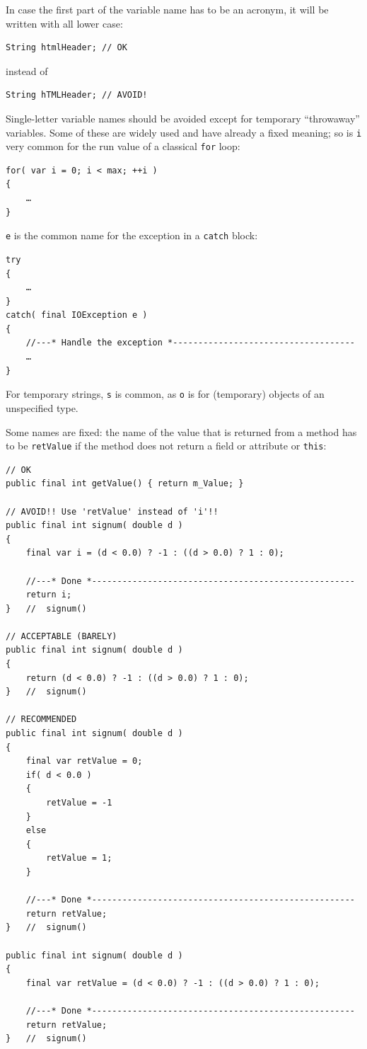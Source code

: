 \documentclass[11pt,a4paper, titlepage, parskip=half, headsepline, footsepline, cleardoublepage=current, headheight=1cm]{scrbook}
\begin{document}
In case the first part of the variable name has to be an acronym, it will be written with all lower case:
\begin{lstlisting}
String htmlHeader; // OK
\end{lstlisting}
instead of
\begin{lstlisting}
String hTMLHeader; // AVOID!
\end{lstlisting}

Single-letter variable names should be avoided except for temporary “throwaway” variables. Some of these are widely used and have already a fixed meaning; so is \lstinline|i| very common for the run value of a classical \lstinline|for| loop:
\begin{lstlisting}
for( var i = 0; i < max; ++i )
{
    …
}
\end{lstlisting}

\lstinline|e| is the common name for the exception in a \lstinline|catch| block:
\begin{lstlisting}
try
{
    …
}
catch( final IOException e )
{
    //---* Handle the exception *------------------------------------
    …
}    
\end{lstlisting}

For temporary strings, \lstinline|s| is common, as \lstinline|o| is for (temporary) objects of an unspecified type.

Some names are fixed: the name of the value that is returned from a method has to be \lstinline|retValue| if the method does not return a field or attribute or \lstinline|this|:
\begin{lstlisting}
// OK
public final int getValue() { return m_Value; }

// AVOID!! Use 'retValue' instead of 'i'!!
public final int signum( double d )
{
    final var i = (d < 0.0) ? -1 : ((d > 0.0) ? 1 : 0);
    
    //---* Done *----------------------------------------------------
    return i;
}   //  signum()

// ACCEPTABLE (BARELY)
public final int signum( double d )
{
    return (d < 0.0) ? -1 : ((d > 0.0) ? 1 : 0);
}   //  signum()

// RECOMMENDED
public final int signum( double d )
{
    final var retValue = 0;
    if( d < 0.0 )
    {
        retValue = -1
    }
    else
    {
        retValue = 1;
    }

    //---* Done *----------------------------------------------------
    return retValue;
}   //  signum()

public final int signum( double d )
{
    final var retValue = (d < 0.0) ? -1 : ((d > 0.0) ? 1 : 0);

    //---* Done *----------------------------------------------------
    return retValue;
}   //  signum()
\end{lstlisting}
\end{document}
